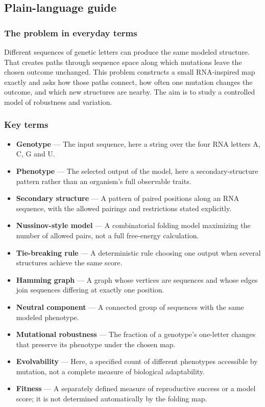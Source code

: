 \documentclass[
  11pt,
]{article}
\begin{document}
\subsection{Plain-language guide}

\subsubsection{The problem in everyday terms}

Different sequences of genetic letters can produce the same modeled
structure. That creates paths through sequence space along which
mutations leave the chosen outcome unchanged. This problem constructs a
small RNA-inspired map exactly and asks how those paths connect, how
often one mutation changes the outcome, and which new structures are
nearby. The aim is to study a controlled model of robustness and
variation.

\subsubsection{Key terms}

\begin{itemize}
\item
  \textbf{Genotype} --- The input sequence, here a string over the four
  RNA letters A, C, G and U.
\item
  \textbf{Phenotype} --- The selected output of the model, here a
  secondary-structure pattern rather than an organism's full observable
  traits.
\item
  \textbf{Secondary structure} --- A pattern of paired positions along
  an RNA sequence, with the allowed pairings and restrictions stated
  explicitly.
\item
  \textbf{Nussinov-style model} --- A combinatorial folding model
  maximizing the number of allowed pairs, not a full free-energy
  calculation.
\item
  \textbf{Tie-breaking rule} --- A deterministic rule choosing one
  output when several structures achieve the same score.
\item
  \textbf{Hamming graph} --- A graph whose vertices are sequences and
  whose edges join sequences differing at exactly one position.
\item
  \textbf{Neutral component} --- A connected group of sequences with the
  same modeled phenotype.
\item
  \textbf{Mutational robustness} --- The fraction of a genotype's
  one-letter changes that preserve its phenotype under the chosen map.
\item
  \textbf{Evolvability} --- Here, a specified count of different
  phenotypes accessible by mutation, not a complete measure of
  biological adaptability.
\item
  \textbf{Fitness} --- A separately defined measure of reproductive
  success or a model score; it is not determined automatically by the
  folding map.
\end{itemize}
\end{document}
